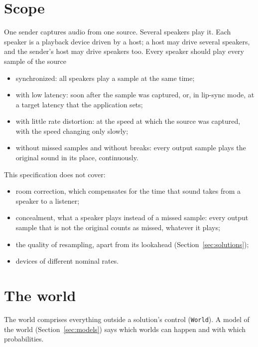 \documentclass[11pt,a4paper]{article}
\newcommand{\lean}[1]{\texttt{#1}}
\theoremstyle{definition}
\begin{document}
\section{Scope}

One sender captures audio from one source. Several speakers play it. Each
speaker is a playback device driven by a host; a host may drive several
speakers, and the sender's host may drive speakers too. Every speaker should
play every sample of the source
\begin{itemize}
\item synchronized: all speakers play a sample at the same time;
\item with low latency: soon after the sample was captured, or, in lip-sync
  mode, at a target latency that the application sets;
\item with little rate distortion: at the speed at which the source was
  captured, with the speed changing only slowly;
\item without missed samples and without breaks: every output sample plays
  the original sound in its place, continuously.
\end{itemize}
This specification does not cover:
\begin{itemize}
\item room correction, which compensates for the time that sound takes from
  a speaker to a listener;
\item concealment, what a speaker plays instead of a missed sample: every
  output sample that is not the original counts as missed, whatever it
  plays;
\item the quality of resampling, apart from its lookahead
  (Section~\ref{sec:solutions});
\item devices of different nominal rates.
\end{itemize}

\section{The world}\label{sec:world}

The world comprises everything outside a solution's control (\lean{World}).
A model of the world (Section~\ref{sec:models}) says which worlds can
happen and with which probabilities.
\end{document}
